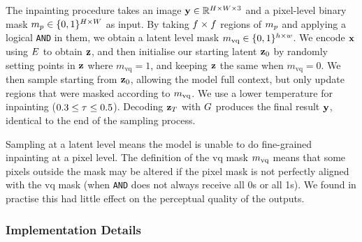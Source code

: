 The inpainting procedure takes an image $\mathbf{y} \in \mathbb{R}^{H \times W \times 3}$
and a pixel-level binary mask $m_p \in \{0, 1\}^{H \times W}$ as input.
By taking $f \times f$ regions of $m_p$ and
applying a logical \texttt{AND} in them, we obtain a latent level mask $m_\textrm{vq}
\in \{0,1\}^{h \times w}$. We encode $\mathbf{x}$ using $E$ to obtain
$\mathbf{z}$, and then initialise our starting latent $\mathbf{z}_0$ by randomly
setting points in $\mathbf{z}$ where $m_\text{vq} = 1$, and keeping $\mathbf{z}$ the
same when $m_\text{vq} = 0$. We then sample starting from $\mathbf{z}_0$, allowing
the model full context, but only update regions that were masked according to
$m_\textrm{vq}$. We use a lower temperature for inpainting ($0.3 \leq \tau
\leq 0.5$). Decoding $\mathbf{z}_T$ with $G$ produces the final result
$\mathbf{y}$, identical to the end of the sampling process.

Sampling at a latent level means the model is unable to do fine-grained
inpainting at a pixel level. The definition of the \gls{vq} mask $m_\textrm{vq}$ means
that some pixels outside the mask may be altered if the pixel mask is not
perfectly aligned with the \gls{vq} mask (when \texttt{AND} does not always
receive all 0s or all 1s). We found in practise this had little effect on the
perceptual quality of the outputs.

\subsubsection*{Implementation Details}

